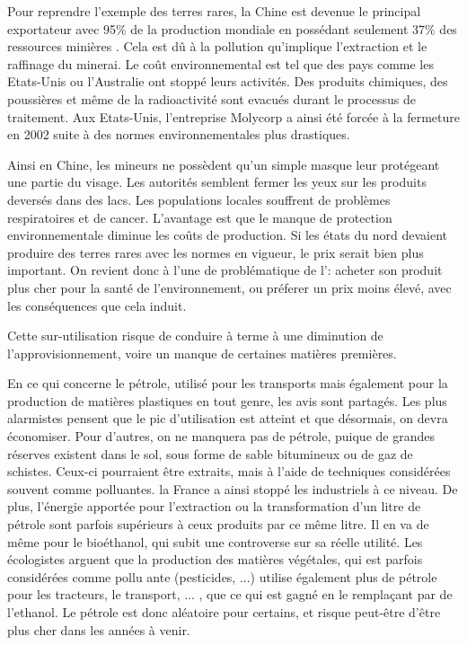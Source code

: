 Pour reprendre l'exemple des terres rares, la Chine est devenue le principal exportateur avec 95\% de la production mondiale en possédant seulement 37\% des ressources minières \cite{MongolieChine}. Cela est dû à la pollution qu'implique l'extraction et le raffinage du minerai. Le coût environnemental est tel que des pays comme les Etats-Unis ou l'Australie ont stoppé leurs activités. Des produits chimiques, des poussières et même de la radioactivité sont evacués durant le processus de traitement. Aux Etats-Unis, l'entreprise Molycorp a ainsi été forcée à la fermeture en 2002 suite à des normes environnementales plus drastiques.

Ainsi en Chine, les mineurs ne possèdent qu'un simple masque leur protégeant une partie du visage. Les autorités semblent fermer les yeux sur les produits deversés dans des lacs. Les populations locales souffrent de problèmes respiratoires et de cancer. L'avantage est que le manque de protection environnementale diminue les coûts de production. Si les états du nord devaient produire des terres rares avec les normes en vigueur, le prix serait bien plus important. On revient donc à l'une de problématique de l'\op : acheter son produit plus cher pour la santé de l'environnement, ou préferer un prix moins élevé, avec les conséquences que cela induit.


\medbreak Cette sur-utilisation risque de conduire à terme à une diminution de l'approvisionnement, voire un manque de certaines matières premières.

En ce qui concerne le pétrole, utilisé pour les transports mais également pour la production de matières plastiques en tout genre, les avis sont partagés. Les plus alarmistes pensent que le pic d'utilisation est atteint et que désormais, on devra économiser. Pour d'autres, on ne manquera pas de pétrole, puique de grandes réserves existent dans le sol, sous forme de sable bitumineux ou de gaz de schistes. Ceux-ci pourraient être extraits, mais à l'aide de techniques considérées souvent comme polluantes. la France a ainsi stoppé les industriels à ce niveau. De plus, l'énergie apportée pour l'extraction ou la transformation d'un litre de pétrole sont parfois supérieurs à ceux produits par ce même litre. Il en va de même pour le bioéthanol, qui subit une controverse sur sa réelle utilité. Les écologistes arguent que la production des matières végétales, qui est parfois considérées comme pollu	ante (pesticides, ...) utilise également plus de pétrole pour les tracteurs, le transport, ... , que ce qui est gagné en le remplaçant par de l'ethanol. Le pétrole est donc aléatoire pour certains, et risque peut-être d'être plus cher dans les années à venir.


